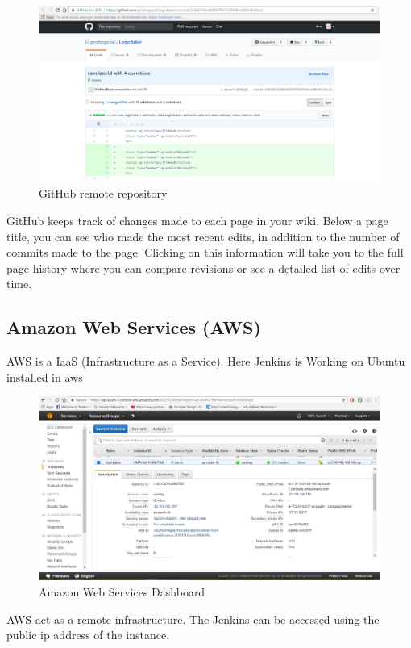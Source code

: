 \documentclass[12pt,a4paper,oneside]{report}
\begin{document}
{\pagebreak
\begin{figure}[h]
\begin{center}
\includegraphics[scale=.47]{remote.png}
\caption{GitHub remote repository }
\label{GitHub remote repository}
\end{center}
\end{figure}
\par GitHub keeps track of changes made to each page in your wiki. Below a page title, you can see who made the most recent edits, in addition to the number of commits made to the page. Clicking on this information will take you to the full page history where you can compare revisions or see a detailed list of edits over time.

\pagebreak
\newpage
\subsection{Amazon Web Services (AWS)}
 \par AWS is a IaaS (Infrastructure as a Service).
Here Jenkins is Working on Ubuntu installed in aws 
\begin{figure}[h]
\begin{center}
\includegraphics[scale=.47]{aws.png}
\caption{Amazon Web Services Dashboard}
\label{Amazon Web Services Dashboard}
\end{center}
\end{figure}
 \par AWS act as a remote infrastructure. The Jenkins can be accessed using the public ip address of the instance.
\pagebreak
\newpage
}
\end{document}
